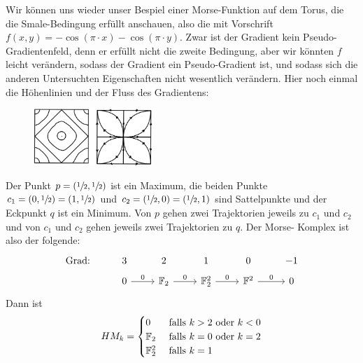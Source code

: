 \begin{example}
    Wir können uns wieder unser Bespiel einer Morse-Funktion auf dem Torus, die die Smale-Bedingung 
    erfüllt anschauen, also die mit Vorschrift $f(x, y) = -\cos (\pi \cdot x) - \cos(\pi \cdot y)$.
    Zwar ist der Gradient kein Pseudo-Gradientenfeld, denn er erfüllt nicht die zweite Bedingung,
    aber wir könnten $f$ leicht verändern, sodass der Gradient ein Pseudo-Gradient ist, und sodass
    sich die anderen Untersuchten Eigenschaften nicht wesentlich verändern.
    Hier noch einmal die Höhenlinien und der Fluss des Gradientens:
    \begin{figure}[H]
        \centering
        \includegraphics[width=0.4\textwidth]{../resources/morse-funktion-torus.jpeg}
    \end{figure}
    Der Punkt $p = (\sfrac{1}{2}, \sfrac{1}{2})$ ist ein Maximum, die beiden Punkte 
        $c_1 = (0, \sfrac{1}{2}) = (1, \sfrac{1}{2})$ und $c_2 = (\sfrac{1}{2}, 0) = (\sfrac{1}{2}, 1)$
        sind Sattelpunkte und der Eckpunkt $q$ ist ein Minimum. Von $p$ gehen zwei Trajektorien jeweils
        zu $c_1$ und $c_2$ und von $c_1$ und $c_2$ gehen jeweils zwei Trajektorien zu $q$. Der Morse-
        Komplex ist also der folgende:
        \[ \begin{tikzcd}[row sep=tiny]
            \text{Grad:} & 3 & 2 & 1 & 0 & -1 \\
            & 0 \arrow[r, "0"] & \F_2 \arrow[r, "0"] & \F_2^2 \arrow[r, "0"] & \F^2 \arrow[r, "0"] & 0
        \end{tikzcd} \]
        Dann ist 
        \[ HM_k = \begin{cases}
            0 & \text{ falls } k > 2 \text{ oder } k < 0 \\
            { \mathbb F }_2 & \text{ falls } k = 0 \text{ oder } k = 2 \\
            { \mathbb F }_2^2 & \text{ falls } k = 1
        \end{cases} \]
\end{example}


